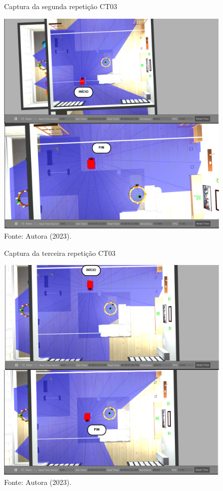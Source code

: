 \begin{figure}[H]
    \centering
    \caption{Captura da segunda repetição CT03}
    \includegraphics[scale=0.5]{ct03_2.png}
    \caption*{Fonte: Autora (2023).}
    \label{fig:ct03_2}
\end{figure}

\begin{figure}[H]
    \centering
    \caption{Captura da terceira repetição CT03}
    \includegraphics[scale=0.5]{ct03_3.png}
    \caption*{Fonte: Autora (2023).}
    \label{fig:ct03_3}
\end{figure}

